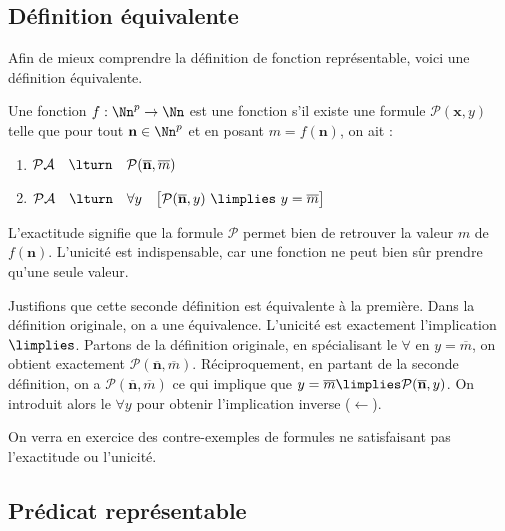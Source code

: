 \documentclass[11pt,class=report,crop=false]{standalone}
\begin{document}
\subsection{Définition équivalente} 

Afin de mieux comprendre la définition de fonction représentable, voici une définition équivalente.

\begin{definition}
Une fonction $f : \Nn^p \to \Nn$ est une fonction  s'il existe une formule $\mathcal{P}(\mathbf{x}, y)$ telle que pour tout $\mathbf{n} \in \Nn^p$ et en posant $m = f(\mathbf{n})$, on ait :
\begin{enumerate}
    \item $\mathcal{PA} \quad \lturn \quad \mathcal{P}(\overline{\mathbf{n}}, \overline{m})$ \qquad {}
    \item $\mathcal{PA} \quad \lturn \quad \forall y \quad \big[ \mathcal{P}(\overline{\mathbf{n}}, y) \ \limplies \ y = \overline{m} \big]$ \qquad {}
\end{enumerate}    
\end{definition}

L'exactitude signifie que la formule $\mathcal{P}$ permet bien de retrouver la valeur $m$ de $f(\mathbf{n})$. L'unicité est indispensable, car une fonction ne peut bien sûr prendre qu'une seule valeur.

Justifions que cette seconde définition est équivalente à la première. 
Dans la définition originale, on a une équivalence. L'unicité est exactement l'implication $\limplies$. 
Partons de la définition originale, en spécialisant le $\forall$ en $y=\overline{m}$, on obtient exactement $\mathcal{P}(\overline{\mathbf{n}}, \overline{m})$. 
Réciproquement, en partant de la seconde définition, on a $\mathcal{P}(\overline{\mathbf{n}}, \overline{m})$ ce qui implique que $y=\overline{m} \limplies \mathcal{P}(\overline{\mathbf{n}},y)$. On introduit alors le $\forall y$ pour obtenir l'implication inverse ($\leftarrow$).

On verra en exercice des contre-exemples de formules ne satisfaisant pas l'exactitude ou l'unicité.

\subsection{Prédicat représentable} 
\end{document}
